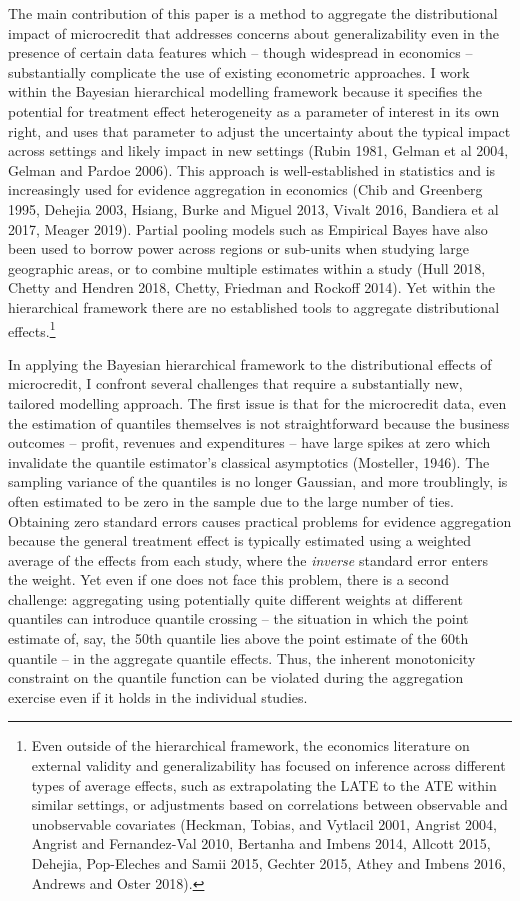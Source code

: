 \documentclass[AER]{AEA}
\begin{document}
The main contribution of this paper is a method to aggregate the distributional impact of microcredit that addresses concerns about generalizability even in the presence of certain data features which -- though widespread in economics -- substantially complicate the use of existing econometric approaches. I work within the Bayesian hierarchical modelling framework because it specifies the potential for treatment effect heterogeneity as a parameter of interest in its own right, and uses that parameter to adjust the uncertainty about the typical impact across settings and likely impact in new settings (Rubin 1981, Gelman et al 2004, Gelman and Pardoe 2006). This approach is well-established in statistics and is increasingly used for evidence aggregation in economics (Chib and Greenberg 1995, Dehejia 2003, Hsiang, Burke and Miguel 2013, Vivalt 2016, Bandiera et al 2017, Meager 2019). Partial pooling models such as Empirical Bayes have also been used to borrow power across regions or sub-units when studying large geographic areas, or to combine multiple estimates within a study (Hull 2018, Chetty and Hendren 2018, Chetty, Friedman and Rockoff 2014). Yet within the hierarchical framework there are no established tools to aggregate distributional effects.\footnote{Even outside of the hierarchical framework, the economics literature on external validity and generalizability has focused on inference across different types of average effects, such as extrapolating the LATE to the ATE within similar settings, or adjustments based on correlations between observable and unobservable covariates (Heckman, Tobias, and Vytlacil 2001, Angrist 2004,  Angrist and Fernandez-Val 2010, Bertanha and Imbens 2014, Allcott 2015, Dehejia, Pop-Eleches and Samii 2015, Gechter 2015, Athey and Imbens 2016, Andrews and Oster 2018). }

In applying the Bayesian hierarchical framework to the distributional effects of microcredit, I confront several challenges that require a substantially new, tailored modelling approach. The first issue is that for the microcredit data, even the estimation of quantiles themselves is not straightforward because the business outcomes -- profit, revenues and expenditures -- have large spikes at zero which invalidate the quantile estimator's classical asymptotics (Mosteller, 1946). The sampling variance of the quantiles is no longer Gaussian, and more troublingly, is often estimated to be zero in the sample due to the large number of ties. Obtaining zero standard errors causes practical problems for evidence aggregation because the general treatment effect is typically estimated using a weighted average of the effects from each study, where the \emph{inverse} standard error enters the weight. Yet even if one does not face this problem, there is a second challenge: aggregating using potentially quite different weights at different quantiles can introduce quantile crossing -- the situation in which the point estimate of, say, the 50th quantile lies above the point estimate of the 60th quantile --  in the aggregate quantile effects. Thus, the inherent monotonicity constraint on the quantile function can be violated during the aggregation exercise even if it holds in the individual studies. 
\end{document}
